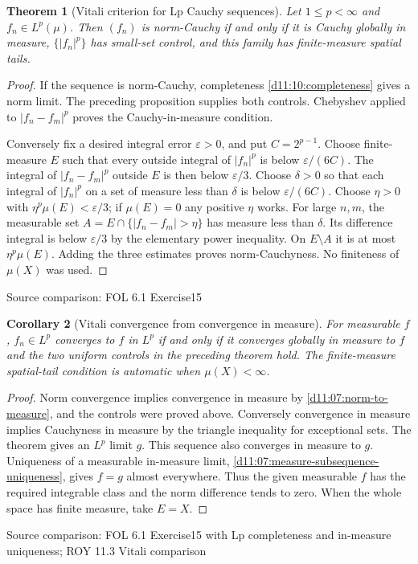 \documentclass[11pt,oneside,openany]{book}
\newtheorem{theorem}{Theorem}[chapter]
\newtheorem{corollary}[theorem]{Corollary}
\theoremstyle{definition}
\theoremstyle{remark}
\newcommand{\eps}{\varepsilon}\newcommand{\ee}{\varepsilon}
\newcommand{\family}[1]{}
\newcommand{\source}[1]{\par\begingroup\small\sffamily\color{black!65}Source comparison: #1\par\endgroup}
\begin{document}
\begin{theorem}[Vitali criterion for Lp Cauchy sequences]\family{D11.17.vitali_lp_cauchy}\label{d11:17:vitali-lp-cauchy}
Let $1\le p<\infty$ and $f_n\in L^p(\mu)$. Then $(f_n)$ is norm-Cauchy if and only if it is Cauchy globally in measure, $\{|f_n|^p\}$ has small-set control, and this family has finite-measure spatial tails.
\end{theorem}
\begin{proof}
If the sequence is norm-Cauchy, completeness \cref{d11:10:completeness} gives a norm limit. The preceding proposition supplies both controls. Chebyshev applied to $|f_n-f_m|^p$ proves the Cauchy-in-measure condition.

Conversely fix a desired integral error $\eps>0$, and put $C=2^{p-1}$. Choose finite-measure $E$ such that every outside integral of $|f_n|^p$ is below $\eps/(6C)$. The integral of $|f_n-f_m|^p$ outside $E$ is then below $\eps/3$. Choose $\delta>0$ so that each integral of $|f_n|^p$ on a set of measure less than $\delta$ is below $\eps/(6C)$. Choose $\eta>0$ with $\eta^p\mu(E)<\eps/3$; if $\mu(E)=0$ any positive $\eta$ works. For large $n,m$, the measurable set $A=E\cap\{|f_n-f_m|>\eta\}$ has measure less than $\delta$. Its difference integral is below $\eps/3$ by the elementary power inequality. On $E\setminus A$ it is at most $\eta^p\mu(E)$. Adding the three estimates proves norm-Cauchyness. No finiteness of $\mu(X)$ was used.
\end{proof}
\source{FOL 6.1 Exercise15}

\begin{corollary}[Vitali convergence from convergence in measure]\family{D11.17.vitali_lp_convergence}\label{d11:17:vitali-lp-convergence}
For measurable $f$, $f_n\in L^p$ converges to $f$ in $L^p$ if and only if it converges globally in measure to $f$ and the two uniform controls in the preceding theorem hold. The finite-measure spatial-tail condition is automatic when $\mu(X)<\infty$.
\end{corollary}
\begin{proof}
Norm convergence implies convergence in measure by \cref{d11:07:norm-to-measure}, and the controls were proved above. Conversely convergence in measure implies Cauchyness in measure by the triangle inequality for exceptional sets. The theorem gives an $L^p$ limit $g$. This sequence also converges in measure to $g$. Uniqueness of a measurable in-measure limit, \cref{d11:07:measure-subsequence-uniqueness}, gives $f=g$ almost everywhere. Thus the given measurable $f$ has the required integrable class and the norm difference tends to zero. When the whole space has finite measure, take $E=X$.
\end{proof}
\source{FOL 6.1 Exercise15 with Lp completeness and in-measure uniqueness; ROY 11.3 Vitali comparison}
\end{document}
